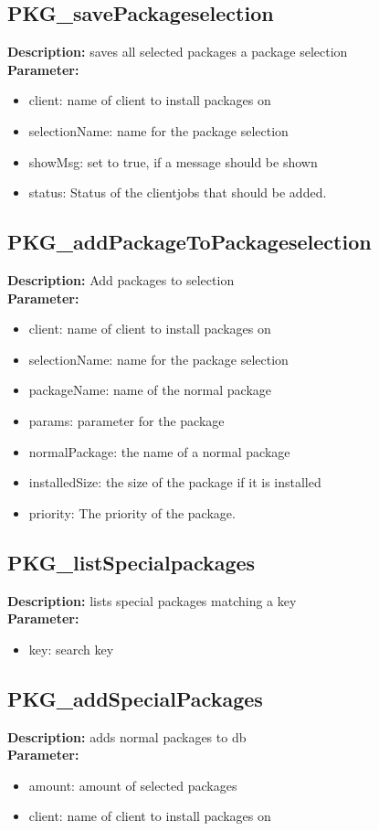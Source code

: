 \subsection{PKG\_savePackageselection}
\textbf{Description:} saves all selected packages a package selection\\
\textbf{Parameter:}
\begin{itemize}
\item client: name of client to install packages on
\item selectionName: name for the package selection
\item showMsg: set to true, if a message should be shown
\item status: Status of the clientjobs that should be added.
\end{itemize}

\subsection{PKG\_addPackageToPackageselection}
\textbf{Description:} Add packages to selection\\
\textbf{Parameter:}
\begin{itemize}
\item client: name of client to install packages on
\item selectionName: name for the package selection
\item packageName: name of the normal package
\item params: parameter for the package
\item normalPackage: the name of a normal package
\item installedSize: the size of the package if it is installed
\item priority: The priority of the package.
\end{itemize}

\subsection{PKG\_listSpecialpackages}
\textbf{Description:} lists special packages matching a key\\
\textbf{Parameter:}
\begin{itemize}
\item key: search key
\end{itemize}

\subsection{PKG\_addSpecialPackages}
\textbf{Description:} adds normal packages to db\\
\textbf{Parameter:}
\begin{itemize}
\item amount: amount of selected packages
\item client: name of client to install packages on
\end{itemize}

